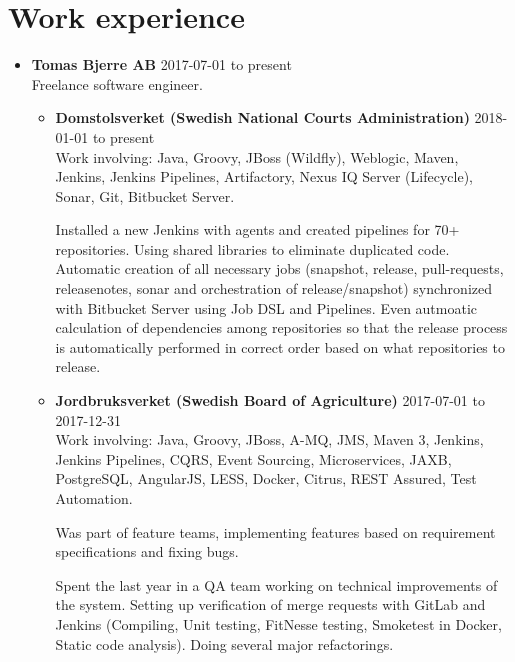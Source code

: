 \documentclass[a4paper]{article}
\begin{document}
\section*{Work experience}
\begin{itemize}
 \item \textbf{Tomas Bjerre AB} 2017-07-01 to present \\
 Freelance software engineer.
 \begin{itemize}
  \item \textbf{Domstolsverket (Swedish National Courts Administration)} 2018-01-01 to present \\
  Work involving: Java, Groovy, JBoss (Wildfly), Weblogic, Maven, Jenkins, Jenkins Pipelines, Artifactory, Nexus IQ Server (Lifecycle), Sonar, Git, Bitbucket Server.

  Installed a new Jenkins with agents and created pipelines for 70+ repositories. Using shared libraries to eliminate duplicated code. Automatic creation of all necessary jobs (snapshot, release, pull-requests, releasenotes, sonar and orchestration of release/snapshot) synchronized with Bitbucket Server using Job DSL and Pipelines. Even autmoatic calculation of dependencies among repositories so that the release process is automatically performed in correct order based on what repositories to release.
  \item \textbf{Jordbruksverket (Swedish Board of Agriculture)} 2017-07-01 to 2017-12-31 \\
  Work involving: Java, Groovy, JBoss, A-MQ, JMS, Maven 3, Jenkins, Jenkins Pipelines, CQRS, Event Sourcing, Microservices, JAXB, PostgreSQL, AngularJS, LESS, Docker, Citrus, REST Assured, Test Automation.

  Was part of feature teams, implementing features based on requirement specifications and fixing bugs.

  Spent the last year in a QA team working on technical improvements of the system. Setting up verification of merge requests with GitLab and Jenkins (Compiling, Unit testing, FitNesse testing, Smoketest in Docker, Static code analysis). Doing several major refactorings.
 \end{itemize}
\end{itemize}
  
\end{document}
